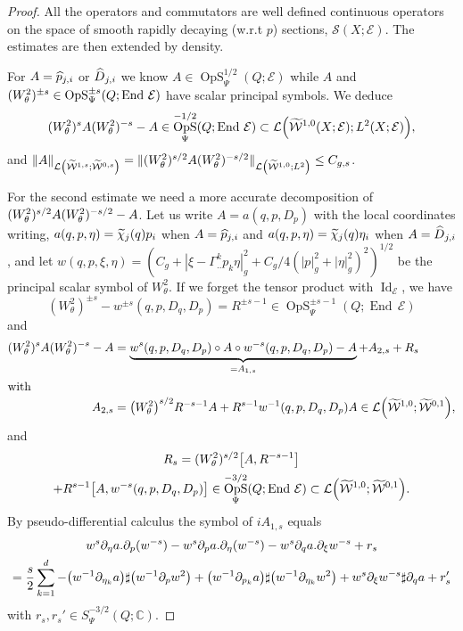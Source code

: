\documentclass[10pt]{amsart}
\theoremstyle{definition}\newtheorem{defi}[theo]{Definition}\newtheorem{rema}[theo]{Remark}\newtheorem{exam}[theo]{Example}\newtheorem{exem}[theo]{Example}\newtheorem{nota}[theo]{Notation}
\newcommand{\C}{\mathbb{C}}
\newcommand{\clW}{\mathcal{W}}
\newcommand{\clE}{\mathcal{E}}
\newcommand{\clS}{\mathcal{S}}
\newcommand{\clL}{\mathcal{L}}
\DeclareMathOperator{\End}{End}
\DeclareMathOperator{\OpS}{OpS}
\DeclareMathOperator{\Idd}{Id}
\let\oldtilde\tilde
\renewcommand*{\tilde}[1]{\mathchoice{\widetilde{#1}}{\widetilde{#1}}{\oldtilde{#1}}{\oldtilde{#1}}}
\let\oldhat\hat
\renewcommand*{\hat}[1]{\mathchoice{\widehat{#1}}{\widehat{#1}}{\oldhat{#1}}{\oldhat{#1}}}
\let\originalleft\left
\let\originalright\right
\renewcommand{\left}{\mathopen{}\mathclose\bgroup\originalleft}
\renewcommand{\right}{\aftergroup\egroup\originalright}
\begin{document}
\begin{proof}
All the operators and commutators are well defined continuous operators on the space of smooth rapidly decaying (w.r.t $p$) sections, $\clS(X;\clE)$. The estimates are then extended by density.

For $A=\hat{p}_{j,i}$ or $\hat{D}_{j,i}$ we know $A\in \OpS^{1/2}_{\Psi}(Q;\clE)$ while $A$ and $(W^{2}_{\theta})^{\pm s}\in \OpS^{\pm s}_{\Psi}(Q;\linebreak\End\,\clE)$ have scalar principal symbols. We deduce
\[
(W^{2}_{\theta})^{s}A(W^{2}_{\theta})^{-s}-A\in \OpS^{-1/2}_{\Psi}(Q;\End\,\clE)\subset \clL\left(\tilde{\clW}^{1,0}(X;\clE);L^{2}(X;\clE)\right),
\]
and $\|A\|_{\clL\left(\widetilde{\clW}^{1,s};\widetilde{\clW}^{0,s}\right)}=\|(W^{2}_{\theta})^{s/2}A(W^{2}_{\theta})^{-s/2}\|_{\clL\left(\widetilde{\clW}^{1,0};L^{2}\right)}\leq C_{g,s}$.

For the second estimate we need a more accurate decomposition of $(W^{2}_{\theta})^{s/2}\linebreak A(W^{2}_{\theta})^{-s/2}-A$. Let us write $A=a(q,p,D_{p})$ with the local coordinates writing, $a(q,p,\eta)=\tilde{\chi}_{j}(q)p_{i}$ when $A=\hat{p}_{j,i}$ and $a(q,p,\eta)=\tilde{\chi}_{j}(q)\eta_{i}$ when $A=\hat{D}_{j,i}$, and let $w(q,p,\xi,\eta)=(C_{g}+|\xi-\Gamma_{..}^{k}p_{k}\eta|_{g}^{2}+C_{g}/4(|p|_{g}^{2}+|\eta|_{g}^{2})^{2})^{1/2}$ be the principal scalar symbol of $W^{2}_{\theta}$. If we forget the tensor product with $\Idd_{\clE}$, we have
\[
(W^{2}_{\theta})^{\pm s}-w^{\pm s}(q,p,D_{q},D_{p})=R^{\pm s-1}\in \OpS^{\pm s -1}_{\Psi}(Q;\End\,\clE)
\]
and
\begin{align*}
(W^{2}_{\theta})^{s}A(W^{2}_{\theta})^{-s}-A &=\underbrace{w^{s}(q,p,D_{q},D_{p})\circ A\circ w^{-s}(q,p,D_{q},D_{p})-A}_{=A_{1,s}}+ A_{2,s} +R_{s}
\\
\intertext{with}
A_{2,s}&= \left(W^{2}_{\theta}\right)^{s/2}R^{-s-1}A+R^{s-1}w^{-1}(q,p,D_{q},D_{p})A\in \clL\left(\tilde{\clW}^{1,0};\tilde{\clW}^{0,1}\right),\\
\end{align*}
and
\begin{multline*}
R_{s}=(W^{2}_{\theta})^{s/2}\left[A,R^{-s-1}\right]\\
+R^{s-1}\left[A,w^{-s}(q,p,D_{q},D_{p})\right]
\in
\OpS^{-3/2}_{\Psi}(Q;\End\,\clE)\subset \clL\left(\tilde{\clW}^{1,0};\tilde{\clW}^{0,1}\right).
\end{multline*}
By pseudo-differential calculus the symbol of $iA_{1,s}$ equals
\begin{multline*}
w^{s}\partial_{\eta}a.\partial_{p}(w^{-s})-w^{s}\partial_{p}a.\partial_{\eta}(w^{-s})-w^{s}\partial_{q}a.\partial_{\xi}w^{-s}+r_{s}\\
=\frac{s}{2}\sum_{k=1}^{d}-\left(w^{-1}\partial_{\eta_{k}}a\right)
\sharp \left(w^{-1}\partial_{p}w^{2}\right)+\left(w^{-1}\partial_{p_{k}}a\right)\sharp \left(w^{-1}\partial_{\eta_{k}}w^{2}\right)+ w^{s}\partial_{\xi}w^{-s}\sharp \partial_{q}a +r_{s}'
\end{multline*}
with $r_{s},r_{s}'\in S^{-3/2}_{\Psi}(Q;\C)$.


\end{proof}
\end{document}
